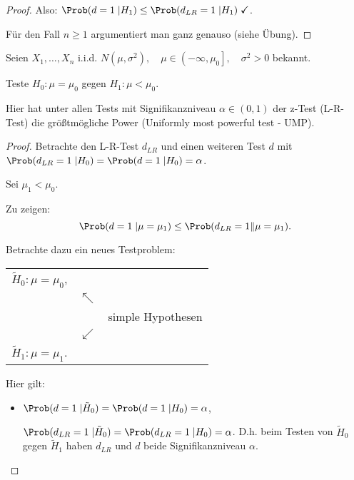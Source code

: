 \documentclass{tstextbook}
\begin{document}
\begin{proof}
	Also: $ \Prob(d=1\;|H_1)\le\Prob(d_{LR}=1\;|H_1) \;\checkmark $.
	
	Für den Fall $ n\ge 1 $ argumentiert man ganz genauso (siehe Übung).
\end{proof}

\begin{corollary}
	Seien $ X_1,\ldots,X_n $ i.i.d. $ N(\mu,\sigma^2), \quad \mu \in \left(-\infty,\mu_0\right], \quad \sigma^2 > 0  $ bekannt.
	
	Teste $ H_0\colon \mu=\mu_0 $ gegen $ H_1\colon \mu < \mu_0 $. 
	
	Hier hat unter allen Tests mit Signifikanzniveau $ \alpha\in(0,1) $ der z-Test (L-R-Test) die größtmögliche Power (Uniformly most powerful test - UMP).  
\end{corollary}

\begin{proof}
	Betrachte den L-R-Test $ d_{LR} $ und einen weiteren Test $ d $ mit $ \Prob(d_{LR}=1\;|H_0)=\Prob(d=1\;|H_0)=\alpha $.
	
	Sei $ \mu_1 < \mu_0 $. 
	
	Zu zeigen: 
	\[
	\Prob(d=1\;|\mu=\mu_1) \le \Prob(d_{LR}=1\|\mu=\mu_1).
	\]
	
	Betrachte dazu ein neues Testproblem:
	
	\begin{center}
		\begin{tabular}{lll}
			$ \tilde{H}_0\colon\mu=\mu_0 $, & & \\
			& $ \nwarrow $ & \\
			&& simple Hypothesen \\
			& $ \swarrow $ & \\
			$ \tilde{H}_1\colon\mu=\mu_1 $.
		\end{tabular}
	\end{center}
	
	Hier gilt:
	\begin{itemize}
		\item $ \Prob(d=1\;|\tilde{H}_0) = \Prob(d=1\;|H_0) = \alpha $, 
		
		$ \Prob(d_{LR}=1\;|\tilde{H}_0) = \Prob(d_{LR}=1\;|H_0) = \alpha $. 
		D.h. beim Testen von $ \tilde{H}_0 $ gegen $ \tilde{H}_1 $ haben $ d_{LR} $ und $ d $ beide Signifikanzniveau $ \alpha $. 
		

\end{itemize}
\end{proof}
\end{document}
